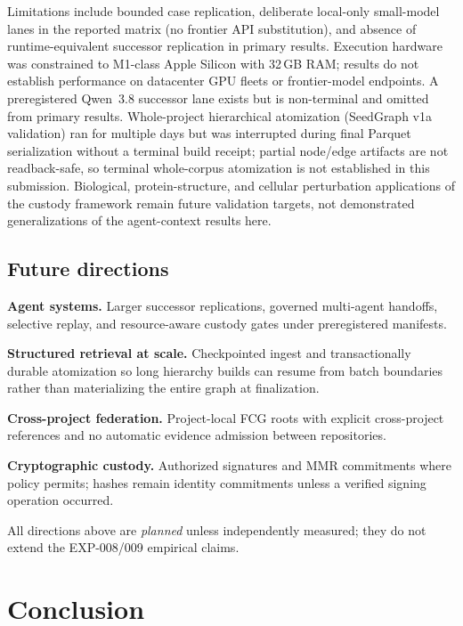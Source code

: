 \documentclass{article}
\begin{document}
Limitations include bounded case replication, deliberate local-only small-model lanes in the reported matrix (no frontier API substitution), and absence of runtime-equivalent successor replication in primary results.
Execution hardware was constrained to M1-class Apple Silicon with 32\,GB RAM; results do not establish performance on datacenter GPU fleets or frontier-model endpoints.
A preregistered Qwen~3.8 successor lane exists but is non-terminal and omitted from primary results.
Whole-project hierarchical atomization (SeedGraph v1a validation) ran for multiple days but was interrupted during final Parquet serialization without a terminal build receipt; partial node/edge artifacts are not readback-safe, so terminal whole-corpus atomization is not established in this submission.
Biological, protein-structure, and cellular perturbation applications of the custody framework remain future validation targets, not demonstrated generalizations of the agent-context results here.

\subsection{Future directions}

\textbf{Agent systems.} Larger successor replications, governed multi-agent handoffs, selective replay, and resource-aware custody gates under preregistered manifests.

\textbf{Structured retrieval at scale.} Checkpointed ingest and transactionally durable atomization so long hierarchy builds can resume from batch boundaries rather than materializing the entire graph at finalization.

\textbf{Cross-project federation.} Project-local FCG roots with explicit cross-project references and no automatic evidence admission between repositories.

\textbf{Cryptographic custody.} Authorized signatures and MMR commitments where policy permits; hashes remain identity commitments unless a verified signing operation occurred.

All directions above are \emph{planned} unless independently measured; they do not extend the EXP-008/009 empirical claims.

\section{Conclusion}
\end{document}
